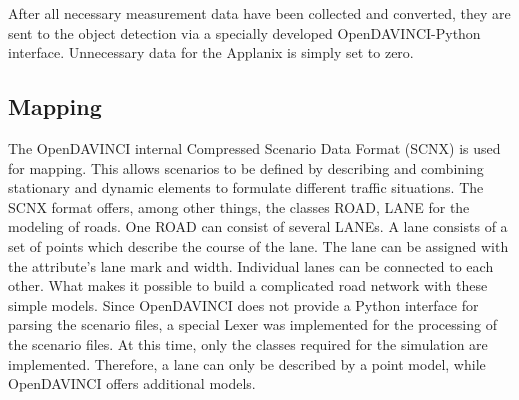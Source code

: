 \documentclass[11pt,oneside,openright]{mpreport}
\begin{document}
After all necessary measurement data have been collected and converted, they are sent to the object detection via a specially developed OpenDAVINCI-Python interface.
Unnecessary data for the Applanix is simply set to zero.

\subsection{Mapping}
The OpenDAVINCI internal Compressed Scenario Data Format (SCNX) \cite{Berger2010} is used for mapping. This allows scenarios to be defined by describing and combining stationary and dynamic elements
to formulate different traffic situations. The SCNX format offers, among other things, the classes ROAD, LANE for the modeling of roads. One ROAD can consist of several LANEs.
A lane consists of a set of points which describe the course of the lane. The lane can be assigned with the attribute's lane mark and width. 
Individual lanes can be connected to each other. What makes it possible to build a complicated road network with these simple models. 
Since OpenDAVINCI does not provide a Python interface for parsing the scenario files, a special Lexer was implemented for the processing of the scenario files. 
At this time, only the classes required for the simulation are implemented. Therefore, a lane can only be described by a point model, while OpenDAVINCI offers additional models.
\end{document}
